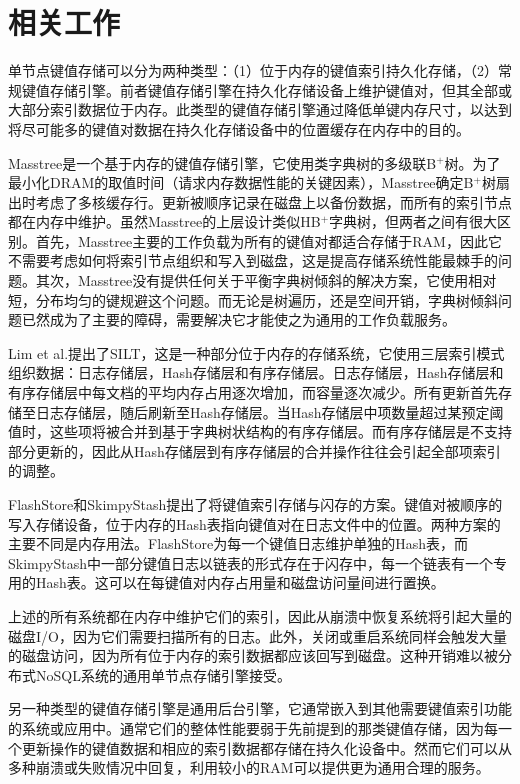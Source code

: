 \section{相关工作}

单节点键值存储可以分为两种类型：（1）位于内存的键值索引持久化存储，（2）常规键值存储引擎。前者键值存储引擎在持久化存储设备上维护键值对，但其全部或大部分索引数据位于内存。此类型的键值存储引擎通过降低单键内存尺寸，以达到将尽可能多的键值对数据在持久化存储设备中的位置缓存在内存中的目的。

Masstree是一个基于内存的键值存储引擎，它使用类字典树的多级联B$^+$树。为了最小化DRAM的取值时间（请求内存数据性能的关键因素），Masstree确定B$^+$树扇出时考虑了多核缓存行。更新被顺序记录在磁盘上以备份数据，而所有的索引节点都在内存中维护。虽然Masstree的上层设计类似HB$^+$字典树，但两者之间有很大区别。首先，Masstree主要的工作负载为所有的键值对都适合存储于RAM，因此它不需要考虑如何将索引节点组织和写入到磁盘，这是提高存储系统性能最棘手的问题。其次，Masstree没有提供任何关于平衡字典树倾斜的解决方案，它使用相对短，分布均匀的键规避这个问题。而无论是树遍历，还是空间开销，字典树倾斜问题已然成为了主要的障碍，需要解决它才能使之为通用的工作负载服务。

Lim et al.提出了SILT，这是一种部分位于内存的存储系统，它使用三层索引模式组织数据：日志存储层，Hash存储层和有序存储层。日志存储层，Hash存储层和有序存储层中每文档的平均内存占用逐次增加，而容量逐次减少。所有更新首先存储至日志存储层，随后刷新至Hash存储层。当Hash存储层中项数量超过某预定阈值时，这些项将被合并到基于字典树状结构的有序存储层。而有序存储层是不支持部分更新的，因此从Hash存储层到有序存储层的合并操作往往会引起全部项索引的调整。

FlashStore和SkimpyStash提出了将键值索引存储与闪存的方案。键值对被顺序的写入存储设备，位于内存的Hash表指向键值对在日志文件中的位置。两种方案的主要不同是内存用法。FlashStore为每一个键值日志维护单独的Hash表，而SkimpyStash中一部分键值日志以链表的形式存在于闪存中，每一个链表有一个专用的Hash表。这可以在每键值对内存占用量和磁盘访问量间进行置换。

上述的所有系统都在内存中维护它们的索引，因此从崩溃中恢复系统将引起大量的磁盘I/O，因为它们需要扫描所有的日志。此外，关闭或重启系统同样会触发大量的磁盘访问，因为所有位于内存的索引数据都应该回写到磁盘。这种开销难以被分布式NoSQL系统的通用单节点存储引擎接受。

另一种类型的键值存储引擎是通用后台引擎，它通常嵌入到其他需要键值索引功能的系统或应用中。通常它们的整体性能要弱于先前提到的那类键值存储，因为每一个更新操作的键值数据和相应的索引数据都存储在持久化设备中。然而它们可以从多种崩溃或失败情况中回复，利用较小的RAM可以提供更为通用合理的服务。

